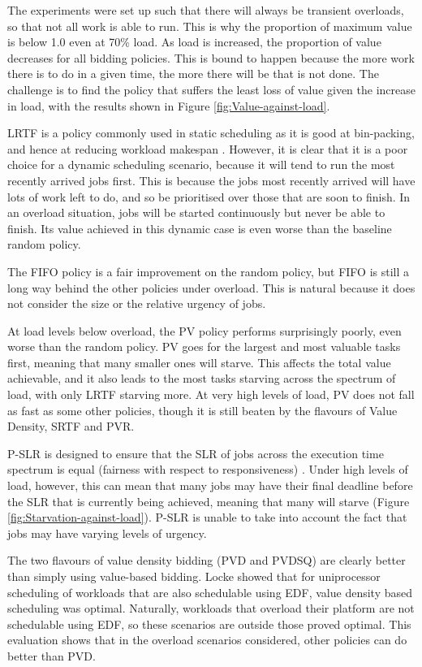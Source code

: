 \documentclass[english,british]{IEEEtran}
\begin{document}
The experiments were set up such that there will always be transient
overloads, so that not all work is able to run. This is why the proportion
of maximum value is below 1.0 even at 70\% load. As load is increased,
the proportion of value decreases for all bidding policies. This is
bound to happen because the more work there is to do in a given time,
the more there will be that is not done. The challenge is to find
the policy that suffers the least loss of value given the increase
in load, with the results shown in Figure \ref{fig:Value-against-load}.

LRTF is a policy commonly used in static scheduling as it is good
at bin-packing, and hence at reducing workload makespan \cite{Topcuoglu2002}.
However, it is clear that it is a poor choice for a dynamic scheduling
scenario, because it will tend to run the most recently arrived jobs
first. This is because the jobs most recently arrived will have lots
of work left to do, and so be prioritised over those that are soon
to finish. In an overload situation, jobs will be started continuously
but never be able to finish. Its value achieved in this dynamic case
is even worse than the baseline random policy.

The FIFO policy is a fair improvement on the random policy, but FIFO
is still a long way behind the other policies under overload. This
is natural because it does not consider the size or the relative urgency
of jobs.

At load levels below overload, the PV policy performs surprisingly
poorly, even worse than the random policy. PV goes for the largest
and most valuable tasks first, meaning that many smaller ones will
starve. This affects the total value achievable, and it also leads
to the most tasks starving across the spectrum of load, with only
LRTF starving more. At very high levels of load, PV does not fall
as fast as some other policies, though it is still beaten by the flavours
of Value Density, SRTF and PVR.

P-SLR is designed to ensure that the SLR of jobs across the execution
time spectrum is equal (fairness with respect to responsiveness) \cite{burkimsher12}.
Under high levels of load, however, this can mean that many jobs may
have their final deadline before the SLR that is currently being achieved,
meaning that many will starve (Figure \ref{fig:Starvation-against-load}).
P-SLR is unable to take into account the fact that jobs may have varying
levels of urgency.

The two flavours of value density bidding (PVD and PVDSQ) are clearly
better than simply using value-based bidding. Locke \cite{Locke1986}
showed that for uniprocessor scheduling of workloads that are also
schedulable using EDF, value density based scheduling was optimal.
Naturally, workloads that overload their platform are not schedulable
using EDF, so these scenarios are outside those proved optimal. This
evaluation shows that in the overload scenarios considered, other
policies can do better than PVD.
\end{document}
